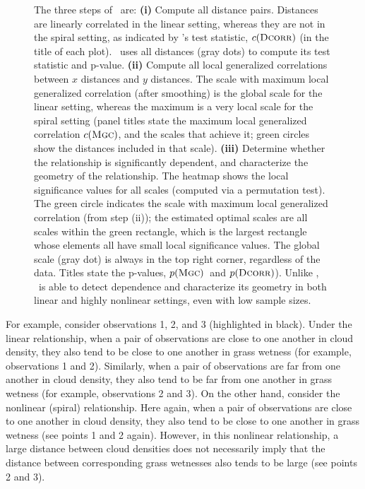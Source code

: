 \documentclass[11pt]{article}
\begin{document}
\begin{figure}
{%
The three steps of \Mgc~are:
% 
\textbf{(i)} Compute all distance pairs. Distances are linearly correlated in the linear setting, whereas they are not in the spiral setting, as indicated by \Dcorr's test statistic, $c({\normalfont\textsc{Dcorr}})$ (in the title of each plot).  \Dcorr~uses all distances (gray dots) to compute its test statistic and p-value.
% 
\textbf{(ii)} Compute all local generalized correlations between $x$ distances and $y$ distances.  The scale with maximum local generalized correlation (after smoothing) is the global scale for the linear setting, whereas the maximum is a very local scale for the spiral setting (panel titles state the maximum local generalized correlation $c({\normalfont\textsc{Mgc}})$, and the scales that achieve it; green circles show the distances included in that scale).
\textbf{(iii)} 
Determine whether the relationship is significantly dependent, and characterize the geometry of the relationship.  
The heatmap shows the local  significance values for all scales (computed via a permutation test). The green circle indicates the scale with maximum local generalized correlation (from step (ii));  the estimated optimal scales are all scales within the green rectangle, which is the largest rectangle whose elements all have small local significance values. The global scale (gray dot) is always in the top right corner, regardless of the data. 
Titles state the p-values,  $p({\normalfont\textsc{Mgc}})$~and $p({\normalfont\textsc{Dcorr}})$).
Unlike \Dcorr, \Mgc~is able to detect dependence and characterize its geometry in both linear and highly nonlinear settings, even with low sample sizes.}
\label{f:newschem}
\end{figure}


For example, consider observations  1, 2, and 3 (highlighted in black).  Under the linear relationship, when a pair of observations are close to one another in cloud density, they  also tend to be close to one another in grass wetness (for example, observations 1 and 2).
Similarly, 
when a pair of observations are far from one another in cloud density, they also tend to be far from one another in grass wetness (for example, observations 2 and 3).  
On the other hand, consider the nonlinear (spiral) relationship.  Here again, when a pair of observations are close to one another in cloud density, they also tend to be close to one another in grass wetness (see points 1 and 2 again).  However, in this nonlinear relationship,  a large distance between cloud densities does not necessarily imply that the distance between corresponding grass wetnesses also tends to be large (see points 2 and 3).
% 
\end{document}
